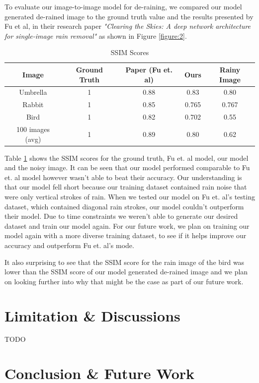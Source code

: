 \documentclass{article}
\begin{document}
To evaluate our image-to-image model for de-raining, we compared our model generated de-rained image to the ground truth value and the results presented by Fu et al, in their research paper \textit{"Clearing the Skies: A deep network architecture for single-image rain removal"} as shown in Figure \ref{figure:2}. 

\begin{table} [h!]
\centering
\begin{tabular}{ | c | c | c | c | c |}
\hline
 Image & Ground Truth & Paper (Fu et. al) & Ours & Rainy Image \\ 
\hline
 Umbrella & 1 & 0.88 & 0.83 & 0.80 \\
 Rabbit & 1 & 0.85 & 0.765 & 0.767 \\
 Bird & 1 & 0.82 & 0.702 & 0.55 \\
 100 images (avg) & 1 & 0.89 & 0.80 & 0.62 \\
 \hline
\end{tabular}
\caption{SSIM Scores}
\label{table:2}
\end{table}

Table \ref{table:2} shows the SSIM scores for the ground truth, Fu et. al model, our model and the noisy image. It can be seen that our model performed comparable to Fu et. al model however wasn't able to beat their accuracy. Our understanding is that our model fell short because our training dataset contained rain noise that were only vertical strokes of rain. When we tested our model on Fu et. al's testing dataset, which contained diagonal rain strokes, our model couldn't outperform their model. Due to time constraints we weren't able to generate our desired dataset and train our model again. For our future work, we plan on training our model again with a more diverse training dataset, to see if it helps improve our accuracy and outperform Fu et. al's mode. 

It also surprising to see that the SSIM score for the rain image of the bird was lower than the SSIM score of our model generated de-rained image and we plan on looking further into why that might be the case as part of our future work. 

\section{Limitation \& Discussions}

TODO

\section{Conclusion \& Future Work}
\end{document}
